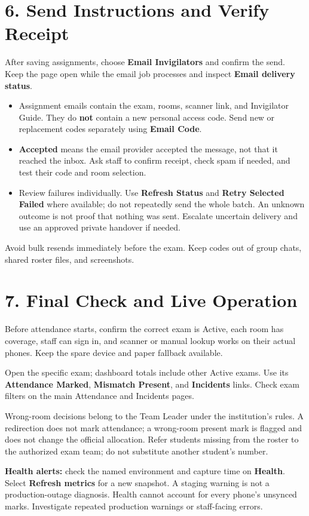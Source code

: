 \documentclass[10pt,a4paper]{article}
\begin{document}
\section*{6. Send Instructions and Verify Receipt}
After saving assignments, choose \textbf{Email Invigilators} and confirm the send. Keep the page open while the email job processes and inspect \textbf{Email delivery status}.\par
\begin{itemize}\item[\textbullet] Assignment emails contain the exam, rooms, scanner link, and Invigilator Guide. They do \textbf{not} contain a new personal access code. Send new or replacement codes separately using \textbf{Email Code}.\end{itemize}
\begin{itemize}\item[\textbullet] \textbf{Accepted} means the email provider accepted the message, not that it reached the inbox. Ask staff to confirm receipt, check spam if needed, and test their code and room selection.\end{itemize}
\begin{itemize}\item[\textbullet] Review failures individually. Use \textbf{Refresh Status} and \textbf{Retry Selected Failed} where available; do not repeatedly send the whole batch. An unknown outcome is not proof that nothing was sent. Escalate uncertain delivery and use an approved private handover if needed.\end{itemize}
Avoid bulk resends immediately before the exam. Keep codes out of group chats, shared roster files, and screenshots.\par
\newpage
\section*{7. Final Check and Live Operation}
Before attendance starts, confirm the correct exam is Active, each room has coverage, staff can sign in, and scanner or manual lookup works on their actual phones. Keep the spare device and paper fallback available.\par
Open the specific exam; dashboard totals include other Active exams. Use its \textbf{Attendance Marked}, \textbf{Mismatch Present}, and \textbf{Incidents} links. Check exam filters on the main Attendance and Incidents pages.\par
Wrong-room decisions belong to the Team Leader under the institution's rules. A redirection does not mark attendance; a wrong-room present mark is flagged and does not change the official allocation. Refer students missing from the roster to the authorized exam team; do not substitute another student's number.\par
\textbf{Health alerts:} check the named environment and capture time on \textbf{Health}. Select \textbf{Refresh metrics} for a new snapshot. A staging warning is not a production-outage diagnosis. Health cannot account for every phone's unsynced marks. Investigate repeated production warnings or staff-facing errors.\par
\end{document}

